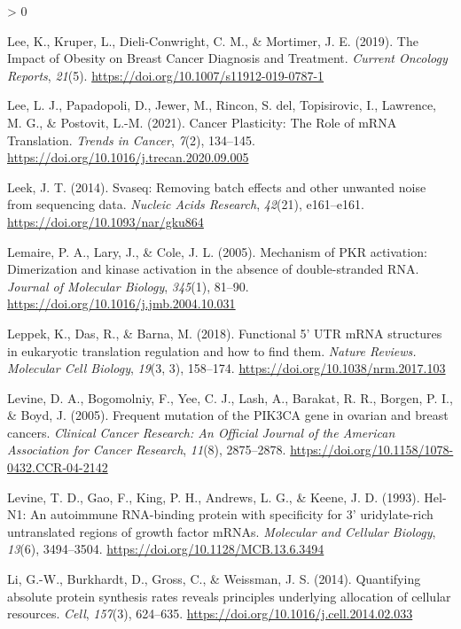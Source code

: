 \documentclass[
  12pt,
  openany]{book}
\newlength{\cslhangindent}
\newenvironment{CSLReferences}[2] %
 {%
  \setlength{\parindent}{0pt}
  \ifodd #1 \everypar{\setlength{\hangindent}{\cslhangindent}}\ignorespaces\fi
  \ifnum #2 > 0
  \setlength{\parskip}{#2\baselineskip}
  \fi
 }%
 {}
\begin{document}
\begin{CSLReferences}{1}{0}
\leavevmode\hypertarget{ref-Lee2019}{}%
Lee, K., Kruper, L., Dieli-Conwright, C. M., \& Mortimer, J. E. (2019). The {Impact} of {Obesity} on {Breast Cancer Diagnosis} and {Treatment}. \emph{Current Oncology Reports}, \emph{21}(5). \url{https://doi.org/10.1007/s11912-019-0787-1}

\leavevmode\hypertarget{ref-Lee2021}{}%
Lee, L. J., Papadopoli, D., Jewer, M., Rincon, S. del, Topisirovic, I., Lawrence, M. G., \& Postovit, L.-M. (2021). Cancer {Plasticity}: {The Role} of {mRNA Translation}. \emph{Trends in Cancer}, \emph{7}(2), 134--145. \url{https://doi.org/10.1016/j.trecan.2020.09.005}

\leavevmode\hypertarget{ref-Leek2014}{}%
Leek, J. T. (2014). Svaseq: Removing batch effects and other unwanted noise from sequencing data. \emph{Nucleic Acids Research}, \emph{42}(21), e161--e161. \url{https://doi.org/10.1093/nar/gku864}

\leavevmode\hypertarget{ref-Lemaire2005}{}%
Lemaire, P. A., Lary, J., \& Cole, J. L. (2005). Mechanism of {PKR} activation: Dimerization and kinase activation in the absence of double-stranded {RNA}. \emph{Journal of Molecular Biology}, \emph{345}(1), 81--90. \url{https://doi.org/10.1016/j.jmb.2004.10.031}

\leavevmode\hypertarget{ref-Leppek2018}{}%
Leppek, K., Das, R., \& Barna, M. (2018). Functional 5' {UTR mRNA} structures in eukaryotic translation regulation and how to find them. \emph{Nature Reviews. Molecular Cell Biology}, \emph{19}(3, 3), 158--174. \url{https://doi.org/10.1038/nrm.2017.103}

\leavevmode\hypertarget{ref-Levine2005}{}%
Levine, D. A., Bogomolniy, F., Yee, C. J., Lash, A., Barakat, R. R., Borgen, P. I., \& Boyd, J. (2005). Frequent mutation of the {PIK3CA} gene in ovarian and breast cancers. \emph{Clinical Cancer Research: An Official Journal of the American Association for Cancer Research}, \emph{11}(8), 2875--2878. \url{https://doi.org/10.1158/1078-0432.CCR-04-2142}

\leavevmode\hypertarget{ref-Levine1993}{}%
Levine, T. D., Gao, F., King, P. H., Andrews, L. G., \& Keene, J. D. (1993). Hel-{N1}: An autoimmune {RNA}-binding protein with specificity for 3' uridylate-rich untranslated regions of growth factor {mRNAs}. \emph{Molecular and Cellular Biology}, \emph{13}(6), 3494--3504. \url{https://doi.org/10.1128/MCB.13.6.3494}

\leavevmode\hypertarget{ref-Li2014}{}%
Li, G.-W., Burkhardt, D., Gross, C., \& Weissman, J. S. (2014). Quantifying absolute protein synthesis rates reveals principles underlying allocation of cellular resources. \emph{Cell}, \emph{157}(3), 624--635. \url{https://doi.org/10.1016/j.cell.2014.02.033}


\end{CSLReferences}
\end{document}
